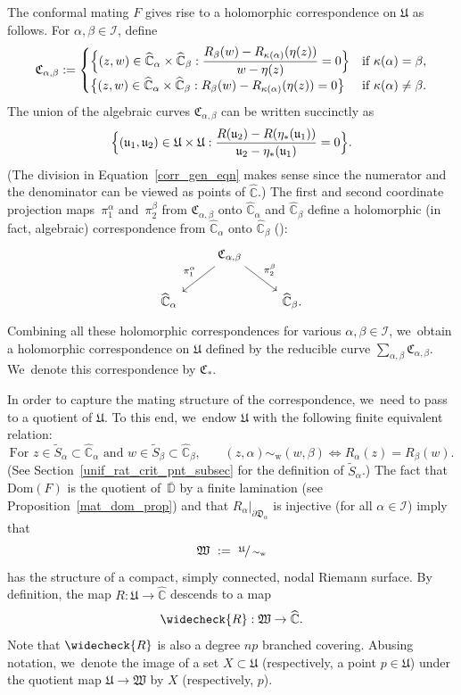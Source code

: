 \documentclass[JEP,XML,SOM,Unicode,NoFloatCountersInSection,published]{cedram}
\let\faktor\sfrac
\theoremstyle{definition}
\theoremstyle{remark}
\newcommand{\C}{\mathbb{C}}
\newcommand{\D}{\mathbb{D}}
\begin{document}
The conformal mating $F$ gives rise to a holomorphic correspondence on $\mathfrak{U}$ as follows. For $\alpha,\beta\in\mathcal{I}$, define
\[
\mathfrak{C}_{\alpha,\beta}:=
\begin{cases}
\Bigl\{(z,w)\in\widehat{\C}_\alpha\times\widehat{\C}_\beta: \dfrac{R_\beta(w)-R_{\kappa(\alpha)}(\eta(z))}{w-\eta(z)}=0\Bigr\}& \text{if } \kappa(\alpha)=\beta,\\
\bigl\{(z,w)\in\widehat{\C}_\alpha\times\widehat{\C}_\beta: R_\beta(w)-R_{\kappa(\alpha)}(\eta(z))=0\bigr\}& \text{if } \kappa(\alpha)\neq \beta.
\end{cases}
\]
The union of the algebraic curves $\mathfrak{C}_{\alpha,\beta}$ can be written succinctly as
\begin{equation}
\Bigl\{(\mathfrak{u}_1,\mathfrak{u}_2)\in\mathfrak{U}\times\mathfrak{U}: \frac{R(\mathfrak{u}_2)-R(\eta_\ast(\mathfrak{u}_1))}{\mathfrak{u}_2-\eta_\ast(\mathfrak{u}_1)}=0 \Bigr\}.
\label{corr_gen_eqn}
\end{equation}
(The division in Equation~\eqref{corr_gen_eqn} makes sense since the numerator and the denominator can be viewed as points of $\widehat{\C}$.)
The first and second coordinate projection maps~$\pi_1^\alpha$ and~$\pi_2^\beta$ from $\mathfrak{C}_{\alpha,\beta}$ onto $\widehat{\C}_\alpha$ and $\widehat{\C}_\beta$ define a holomorphic (in fact, algebraic) correspondence from $\widehat{\C}_\alpha$ onto $\widehat{\C}_\beta$ (\cf \cite{DS06}):
\[
\begin{tikzcd}
& \mathfrak{C}_{\alpha,\beta} \arrow{dl}[swap]{\pi_1^\alpha} \arrow{dr}{\pi_2^\beta} \\
\widehat{\C}_\alpha && \widehat{\C}_\beta.
\end{tikzcd}
\]
Combining all these holomorphic correspondences for various $\alpha,\beta\in\mathcal{I}$, we~obtain a holomorphic correspondence on $\mathfrak{U}$ defined by the reducible curve $\sum_{\alpha,\beta}\mathfrak{C}_{\alpha,\beta}$. We~denote this correspondence by $\mathfrak{C}_\ast$.

In order to capture the mating structure of the correspondence, we~need to pass to a quotient of $\mathfrak{U}$. To this end, we~endow $\mathfrak{U}$ with the following finite equivalent relation:
\[
\text{For $z\in\widetilde{S}_\alpha\subset\widehat{\C}_\alpha$ and $w\in\widetilde{S}_\beta\subset\widehat{\C}_\beta$,}\qquad
(z,\alpha)\sim_{\mathrm{w}} (w,\beta)\iff R_\alpha(z)=R_\beta(w).
\]
(See Section~\ref{unif_rat_crit_pnt_subsec} for the definition of $\widetilde{S}_\alpha$.)
The fact that $\mathrm{Dom}(F)$ is the quotient of~$\overline{\D}$ by a finite lamination (see Proposition~\ref{mat_dom_prop}) and that $R_\alpha\vert_{\partial\mathfrak{D}_\alpha}$ is injective (for all $\alpha\in\mathcal{I}$) imply that
\[
\mathfrak{W}\ :=\ \faktor{\mathfrak{U}}{\sim_{\mathrm{w}}}
\]
has the structure of a compact, simply connected, nodal Riemann surface.
By definition, the map $R:\mathfrak{U}\to\widehat{\C}$ descends to a map
\[
\widecheck{R}: \mathfrak{W}\to\widehat{\C}.
\]
Note that $
\widecheck{R}$ is also a degree $np$ branched covering. Abusing notation, we~denote the image of a set $X\subset\mathfrak{U}$ (respectively, a point $p\in\mathfrak{U}$) under the quotient map $\mathfrak{U}\to\mathfrak{W}$ by $X$ (respectively, $p$).
\end{document}
